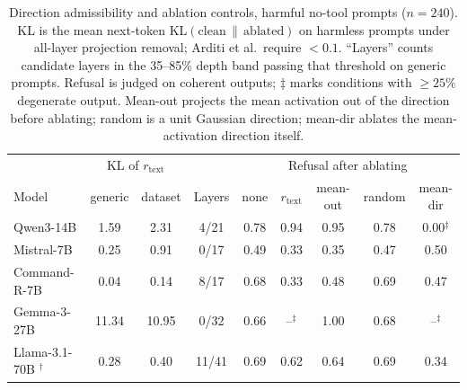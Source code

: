 \begin{table}[t]
\centering
\caption{Direction admissibility and ablation controls, harmful no-tool prompts ($n{=}240$).
KL is the mean next-token KL$(\text{clean}\,\|\,\text{ablated})$ on harmless prompts under
all-layer projection removal; Arditi et al.\ require $<0.1$. ``Layers'' counts candidate layers
in the 35--85\% depth band passing that threshold on generic prompts. Refusal is judged on
coherent outputs; $\ddagger$ marks conditions with $\geq 25\%$ degenerate output. Mean-out projects
the mean activation out of the direction before ablating; random is a unit Gaussian direction;
mean-dir ablates the mean-activation direction itself.}
\label{tab:controls}
  \begin{tabular}{lcc|c|ccccc}
\toprule
 & \multicolumn{2}{c|}{KL of $r_\text{text}$} & & \multicolumn{5}{c}{Refusal after ablating} \\
Model & generic & dataset & Layers & none & $r_\text{text}$ & mean-out & random & mean-dir \\
\midrule
Qwen3-14B      & 1.59 & 2.31 & 4/21 & 0.78 & 0.94 & 0.95 & 0.78 & 0.00$^\ddagger$ \\
Mistral-7B     & 0.25 & 0.91 & 0/17 & 0.49 & 0.33 & 0.35 & 0.47 & 0.50 \\
Command-R-7B   & 0.04 & 0.14 & 8/17 & 0.68 & 0.33 & 0.48 & 0.69 & 0.47 \\
Gemma-3-27B    & 11.34 & 10.95 & 0/32 & 0.66 & --$^\ddagger$ & 1.00 & 0.68 & --$^\ddagger$ \\
Llama-3.1-70B $^\dagger$ & 0.28 & 0.40 & 11/41 & 0.69 & 0.62 & 0.64 & 0.69 & 0.34 \\
\bottomrule
\end{tabular}
\end{table}

